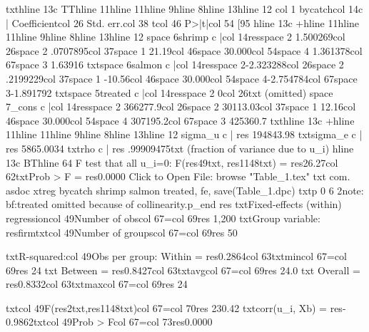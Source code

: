 {txt}{hline 13}{c TT}{hline 11}{hline 11}{hline 9}{hline 8}{hline 13}{hline 12}
{col 1}     bycatch{col 14}{c |} Coefficient{col 26}  Std. err.{col 38}      t{col 46}   P>|t|{col 54}     [95%
{hline 13}{c +}{hline 11}{hline 11}{hline 9}{hline 8}{hline 13}{hline 12}
{space 6}shrimp {c |}{col 14}{res}{space 2} 1.500269{col 26}{space 2} .0707895{col 37}{space 1}   21.19{col 46}{space 3}0.000{col 54}{space 4} 1.361378{col 67}{space 3}  1.63916
{txt}{space 6}salmon {c |}{col 14}{res}{space 2}-2.323288{col 26}{space 2} .2199229{col 37}{space 1}  -10.56{col 46}{space 3}0.000{col 54}{space 4}-2.754784{col 67}{space 3}-1.891792
{txt}{space 5}treated {c |}{col 14}{res}{space 2}        0{col 26}{txt}  (omitted)
{space 7}_cons {c |}{col 14}{res}{space 2} 366277.9{col 26}{space 2} 30113.03{col 37}{space 1}   12.16{col 46}{space 3}0.000{col 54}{space 4} 307195.2{col 67}{space 3} 425360.7
{txt}{hline 13}{c +}{hline 11}{hline 11}{hline 9}{hline 8}{hline 13}{hline 12}
     sigma_u {c |} {res} 194843.98
     {txt}sigma_e {c |} {res} 5865.0034
         {txt}rho {c |} {res} .99909475{txt}   (fraction of variance due to u_i)
{hline 13}{c BT}{hline 64}
F test that all u_i=0: F({res}49{txt}, {res}1148{txt}) = {res}26.27{col 62}{txt}Prob > F = {res}0.0000
Click to Open File:  {browse "Table_1.tex"}
{txt}
{com}. asdoc xtreg bycatch shrimp salmon treated, fe, save(Table_1.dpc)
{txt}{p 0 6 2}note: {bf:treated} omitted because of collinearity.{p_end}
{res}
{txt}Fixed-effects (within) regression{col 49}Number of obs{col 67}={col 69}{res}     1,200
{txt}Group variable: {res}firm{txt}{col 49}Number of groups{col 67}={col 69}{res}        50

{txt}R-squared:{col 49}Obs per group:
     Within  = {res}0.2864{col 63}{txt}min{col 67}={col 69}{res}        24
{txt}     Between = {res}0.8427{col 63}{txt}avg{col 67}={col 69}{res}      24.0
{txt}     Overall = {res}0.8332{col 63}{txt}max{col 67}={col 69}{res}        24

{txt}{col 49}F({res}2{txt},{res}1148{txt}){col 67}={col 70}{res}   230.42
{txt}corr(u_i, Xb) = {res}-0.9862{txt}{col 49}Prob > F{col 67}={col 73}{res}0.0000

